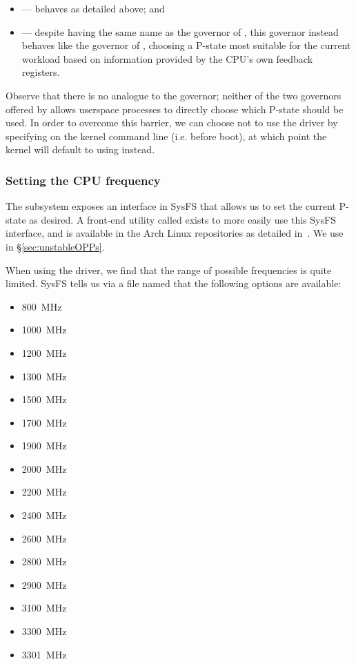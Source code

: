 \begin{itemize}
    \item {} — behaves as detailed above; and
    \item {} — despite having the same name as the
         governor of , this governor instead
        behaves like the  governor of ,
        choosing a P-state most suitable for the current workload based on
        information provided by the CPU's own feedback registers.
\end{itemize}

Observe that there is no analogue to the  governor; neither of
the two governors offered by  allows userspace processes to
directly choose which P-state should be used. In order to overcome this barrier,
we can choose not to use the  driver by specifying
 on the kernel command line (i.e. before boot),
at which point the kernel will default to using  instead.

\subsubsection{Setting the CPU frequency}
\label{sec:cpupower}

The  subsystem exposes an interface in SysFS that allows us to
set the current P-state as desired. A front-end utility called 
exists to more easily use this SysFS interface, and is available in the Arch
Linux repositories as detailed in~\cite{archFrequency}. We use 
in §\ref{sec:unstableOPPs}.

When using the  driver, we find that the range of possible
frequencies is quite limited. SysFS tells us via a file named
 that the following options are available:

\begin{multicols}{3}\raggedcolumns
    \begin{itemize}
        \item 800~MHz
        \item 1000~MHz
        \item 1200~MHz
        \item 1300~MHz
        \item 1500~MHz
        \item 1700~MHz
        \item 1900~MHz
        \item 2000~MHz
        \item 2200~MHz
        \item 2400~MHz
        \item 2600~MHz
        \item 2800~MHz
        \item 2900~MHz
        \item 3100~MHz
        \item 3300~MHz
        \item 3301~MHz
    \end{itemize}
\end{multicols}

